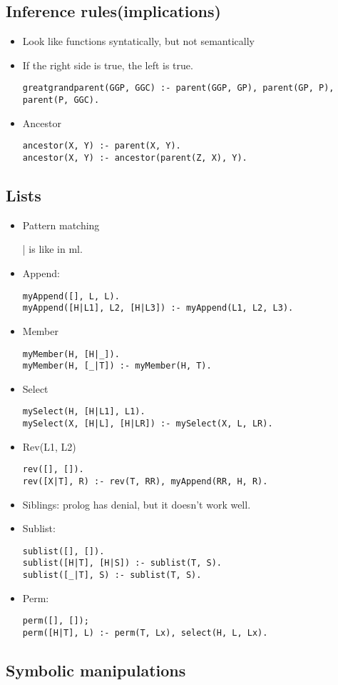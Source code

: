 \documentclass[11pt]{article}
\begin{document}
\subsection{Inference rules(implications)}
\label{sec:org38e690d}
\begin{itemize}
\item Look like functions syntatically, but not semantically
\item If the right side is true, the left is true.
\begin{verbatim}
greatgrandparent(GGP, GGC) :- parent(GGP, GP), parent(GP, P), parent(P, GGC).
\end{verbatim}
\item Ancestor
\begin{verbatim}
ancestor(X, Y) :- parent(X, Y).
ancestor(X, Y) :- ancestor(parent(Z, X), Y).
\end{verbatim}
\end{itemize}
\subsection{Lists}
\label{sec:org1823f81}
\begin{itemize}
\item Pattern matching
\item[{| is like}] in ml.
\item Append:
\begin{verbatim}
myAppend([], L, L).
myAppend([H|L1], L2, [H|L3]) :- myAppend(L1, L2, L3).
\end{verbatim}
\item Member
\begin{verbatim}
myMember(H, [H|_]).
myMember(H, [_|T]) :- myMember(H, T).
\end{verbatim}
\item Select
\begin{verbatim}
mySelect(H, [H|L1], L1).
mySelect(X, [H|L], [H|LR]) :- mySelect(X, L, LR).
\end{verbatim}
\item Rev(L1, L2)
\begin{verbatim}
rev([], []).
rev([X|T], R) :- rev(T, RR), myAppend(RR, H, R).
\end{verbatim}
\item Siblings: prolog has denial, but it doesn't work well.
\item Sublist:
\begin{verbatim}
sublist([], []).
sublist([H|T], [H|S]) :- sublist(T, S).
sublist([_|T], S) :- sublist(T, S).
\end{verbatim}
\item Perm:
\begin{verbatim}
perm([], []);
perm([H|T], L) :- perm(T, Lx), select(H, L, Lx).
\end{verbatim}
\end{itemize}
\subsection{Symbolic manipulations}
\label{sec:org2cf1018}
\end{document}
